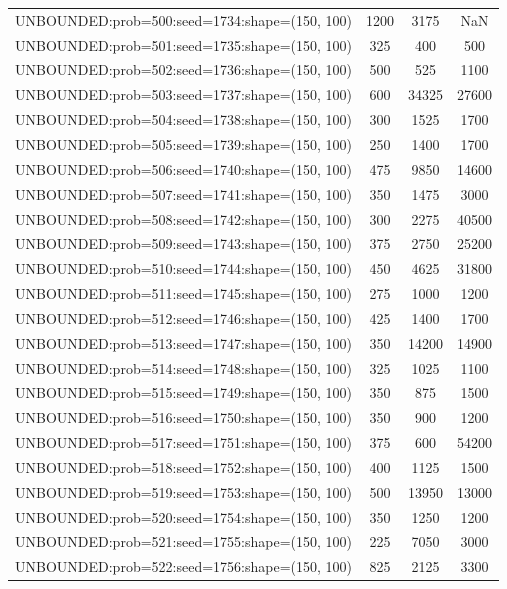 \begin{longtable}{lccc}
UNBOUNDED:prob=500:seed=1734:shape=(150, 100) &     1200 &  3175 &    NaN \\
UNBOUNDED:prob=501:seed=1735:shape=(150, 100) &      325 &   400 &    500 \\
UNBOUNDED:prob=502:seed=1736:shape=(150, 100) &      500 &   525 &   1100 \\
UNBOUNDED:prob=503:seed=1737:shape=(150, 100) &      600 & 34325 &  27600 \\
UNBOUNDED:prob=504:seed=1738:shape=(150, 100) &      300 &  1525 &   1700 \\
UNBOUNDED:prob=505:seed=1739:shape=(150, 100) &      250 &  1400 &   1700 \\
UNBOUNDED:prob=506:seed=1740:shape=(150, 100) &      475 &  9850 &  14600 \\
UNBOUNDED:prob=507:seed=1741:shape=(150, 100) &      350 &  1475 &   3000 \\
UNBOUNDED:prob=508:seed=1742:shape=(150, 100) &      300 &  2275 &  40500 \\
UNBOUNDED:prob=509:seed=1743:shape=(150, 100) &      375 &  2750 &  25200 \\
UNBOUNDED:prob=510:seed=1744:shape=(150, 100) &      450 &  4625 &  31800 \\
UNBOUNDED:prob=511:seed=1745:shape=(150, 100) &      275 &  1000 &   1200 \\
UNBOUNDED:prob=512:seed=1746:shape=(150, 100) &      425 &  1400 &   1700 \\
UNBOUNDED:prob=513:seed=1747:shape=(150, 100) &      350 & 14200 &  14900 \\
UNBOUNDED:prob=514:seed=1748:shape=(150, 100) &      325 &  1025 &   1100 \\
UNBOUNDED:prob=515:seed=1749:shape=(150, 100) &      350 &   875 &   1500 \\
UNBOUNDED:prob=516:seed=1750:shape=(150, 100) &      350 &   900 &   1200 \\
UNBOUNDED:prob=517:seed=1751:shape=(150, 100) &      375 &   600 &  54200 \\
UNBOUNDED:prob=518:seed=1752:shape=(150, 100) &      400 &  1125 &   1500 \\
UNBOUNDED:prob=519:seed=1753:shape=(150, 100) &      500 & 13950 &  13000 \\
UNBOUNDED:prob=520:seed=1754:shape=(150, 100) &      350 &  1250 &   1200 \\
UNBOUNDED:prob=521:seed=1755:shape=(150, 100) &      225 &  7050 &   3000 \\
UNBOUNDED:prob=522:seed=1756:shape=(150, 100) &      825 &  2125 &   3300 \\

\end{longtable}
